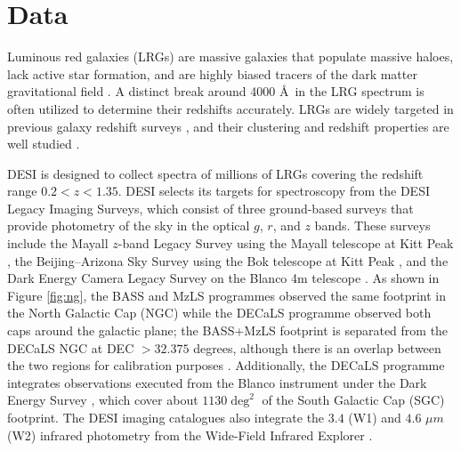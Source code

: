 \section{Data}
\label{sec:data}
Luminous red galaxies (LRGs) are massive galaxies that populate massive haloes, lack active star formation, and are highly biased tracers of the dark matter gravitational field \citep{postman1984ApJ...281...95P, kauffmann}. A distinct break around 4000 \AA~in the LRG spectrum is often utilized to determine their redshifts accurately. LRGs are widely targeted in previous galaxy redshift surveys \citep[see, e.g.,][]{eisenstein2001spectroscopic, prakash2016sdss}, and their clustering and redshift properties are well studied \citep[see, e.g.,][]{ross2020MNRAS.498.2354R, gilmarin2020MNRAS.498.2492G, bautista2021MNRAS.500..736B, chapman2022MNRAS.516..617C}. 

DESI is designed to collect spectra of millions of LRGs covering the redshift range $0.2<z<1.35$. DESI selects its targets for spectroscopy from the DESI Legacy Imaging Surveys, which consist of three ground-based surveys that provide photometry of the sky in the optical $g$, $r$, and $z$ bands. These surveys include the Mayall $z$-band Legacy Survey using the Mayall telescope at Kitt Peak \citep[MzLS;][]{dey2018overview}, the Beijing–Arizona Sky Survey using the Bok telescope at Kitt Peak \citep[BASS;][]{zou2017project}, and the Dark Energy Camera Legacy Survey on the Blanco 4m telescope \citep[DECaLS;][]{flaugher2015dark}. As shown in Figure \ref{fig:ng}, the BASS and MzLS programmes observed the same footprint in the North Galactic Cap (NGC) while the DECaLS programme observed both caps around the galactic plane; the BASS+MzLS footprint is separated from the DECaLS NGC at DEC $> 32.375$ degrees, although there is an overlap between the two regions for calibration purposes \citep{dey2018overview}. Additionally, the DECaLS programme integrates observations executed from the Blanco instrument under the Dark Energy Survey \citep{abbott2016dark}, which cover about $1130 \deg^{2}$ of the South Galactic Cap (SGC) footprint. The DESI imaging catalogues also integrate the $3.4$ (W1) and $4.6$ $\mu m$ (W2) infrared photometry from the Wide-Field Infrared Explorer \citep[WISE;][]{wise2010AJ....140.1868W, meisner2018RNAAS...2....1M}.  

